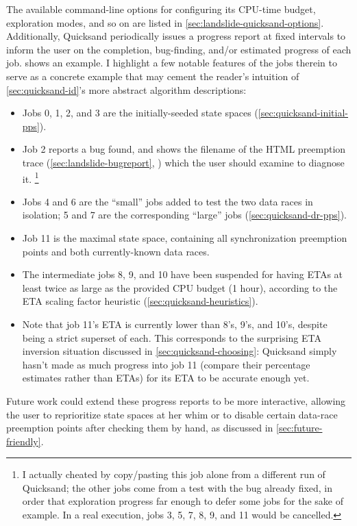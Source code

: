 The available command-line options for configuring its
CPU-time budget, exploration modes, and so on
are listed in \cref{sec:landslide-quicksand-options}.
Additionally, Quicksand periodically issues a progress report
at fixed intervals to inform the user on the completion, bug-finding, and/or estimated progress of each job.
 shows an example.
I highlight a few notable features of the jobs therein
to serve as a concrete example that may cement the reader's intuition
of \cref{sec:quicksand-id}'s more abstract algorithm descriptions:
\begin{itemize}
	\item Jobs 0, 1, 2, and 3 are the initially-seeded state spaces (\cref{sec:quicksand-initial-pps}).
	\item Job 2 reports a bug found, and shows the filename of the HTML preemption trace
		(\cref{sec:landslide-bugreport}, )
		which the user should examine to diagnose it.%
		\footnote{I actually cheated by copy/pasting this job alone from a different run of Quicksand;
		the other jobs come from a test with the bug already fixed,
		in order that exploration progress far enough to defer some jobs for the sake of example.
		In a real execution, jobs 3, 5, 7, 8, 9, and 11 would be cancelled.}
	\item Jobs 4 and 6 are the ``small'' jobs added to test the two data races in isolation;
		5 and 7 are the corresponding ``large'' jobs (\cref{sec:quicksand-dr-pps}).
	\item Job 11 is the maximal state space, containing all synchronization preemption points
		and both currently-known data races.
	\item The intermediate jobs 8, 9, and 10 have been suspended for having ETAs
		at least twice as large as the provided CPU budget (1 hour),
		according to the ETA scaling factor heuristic (\cref{sec:quicksand-heuristics}).
	\item Note that job 11's ETA is currently lower than 8's, 9's, and 10's, despite being a strict superset of each.
		This corresponds to the surprising ETA inversion situation discussed in \cref{sec:quicksand-choosing}:
		Quicksand simply hasn't made as much progress into job 11 (compare their percentage estimates rather than ETAs)
		for its ETA to be accurate enough yet.
\end{itemize}
Future work could extend these progress reports to be more interactive,
allowing the user to reprioritize state spaces at her whim
or to disable certain data-race preemption points after checking them by hand,
as discussed in \cref{sec:future-friendly}.


